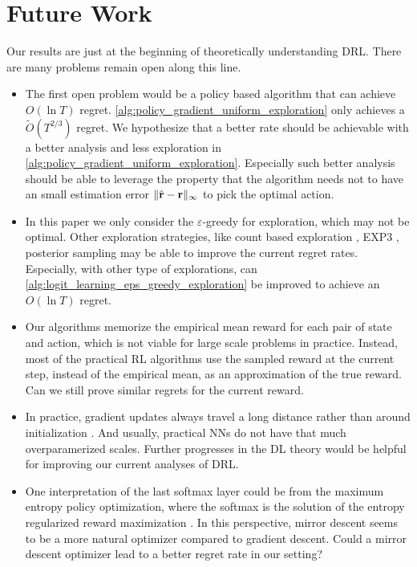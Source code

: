 \section{Future Work}
\label{sec:future_work}

Our results are just at the beginning of theoretically understanding DRL. There are many problems remain open along this line.
\begin{itemize}
    \item The first open problem would be a policy based algorithm that can achieve $O(\ln T)$ regret. \cref{alg:policy_gradient_uniform_exploration} only achieves a $\tilde{O}(T^{2/3})$ regret. We hypothesize that a better rate should be achievable with a better analysis and less exploration in \cref{alg:policy_gradient_uniform_exploration}. 
    Especially such better analysis should be able to leverage the property that the algorithm needs not to have an small estimation error $\|\hat{{\mathbf{r}}} - {\mathbf{r}}\|_\infty$ to pick the optimal action.
    \item In this paper we only consider the $\varepsilon$-greedy for exploration, which may not be optimal. Other exploration strategies, like count based exploration \cite{auer2002finite}, EXP3 \citep{seldin2014one}, posterior sampling \citep{agrawal2012analysis} 
    may be able to improve the current regret rates. Especially, with other type of explorations, can \cref{alg:logit_learning_eps_greedy_exploration} be improved to achieve an $O(\ln T)$ regret.
    \item Our algorithms memorize the empirical mean reward for each pair of state and action, which is not viable for large scale problems in practice. Instead, most of the practical RL algorithms use the sampled reward at the current step, instead of the empirical mean, as an approximation of the true reward. Can we still prove similar regrets for the current reward.
    \item In practice, gradient updates always travel a long distance rather than around initialization \citep{liu2018deeptracker}. And usually, practical NNs do not have that much overparamerized scales. Further progresses in the DL theory would be helpful for improving our current analyses of DRL.
    \item One interpretation of the last softmax layer could be from the maximum entropy policy optimization, where the softmax is the solution of the entropy regularized reward maximization \cite{nachum2017bridging}. In this perspective, mirror descent seems to be a more natural optimizer compared to gradient descent. Could a mirror descent optimizer lead to a better regret rate in our setting?

\end{itemize}

